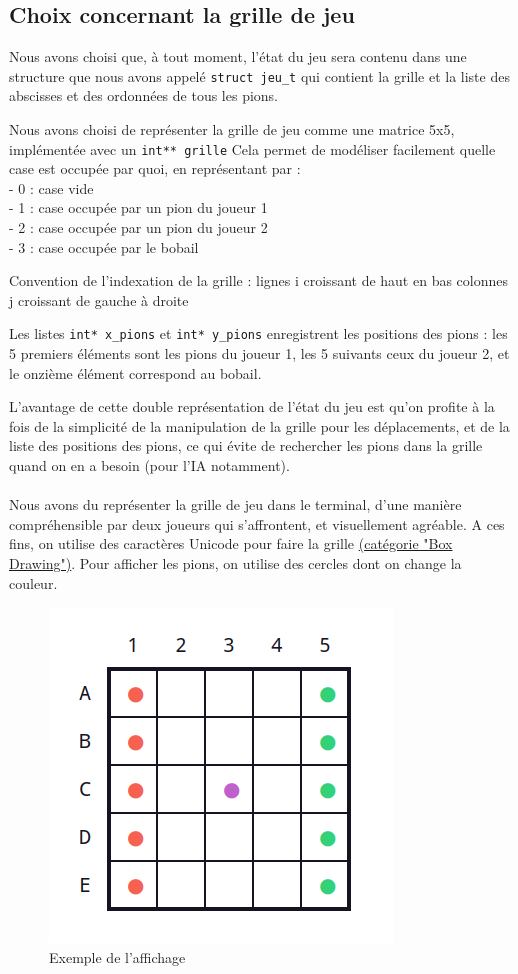 \documentclass{article}
\begin{document}
\subsection{Choix concernant la grille de jeu}

Nous avons choisi que, à tout moment, l'état du jeu sera contenu dans une structure que nous avons appelé {\tt struct jeu\_t} qui contient la grille et la liste des abscisses et des ordonnées de tous les pions.


Nous avons choisi de représenter la grille de jeu comme une matrice 5x5, implémentée avec un {\tt int** grille}
Cela permet de modéliser facilement quelle case est occupée par quoi, en représentant par :
\\- 0 : case vide
\\- 1 : case occupée par un pion du joueur 1
\\- 2 : case occupée par un pion du joueur 2
\\- 3 : case occupée par le bobail


Convention de l'indexation de la grille :
lignes i croissant de haut en bas
colonnes j croissant de gauche à droite


Les listes {\tt int* x\_pions} et {\tt int* y\_pions} enregistrent les positions des pions : les 5 premiers éléments sont les pions du joueur 1, les 5 suivants ceux du joueur 2, et le onzième élément correspond au bobail.


L'avantage de cette double représentation de l'état du jeu est qu'on profite à la fois de la simplicité de la manipulation de la grille pour les déplacements, et de la liste des positions des pions, ce qui évite de rechercher les pions dans la grille quand on en a besoin (pour l'IA notamment).
\\
\\
Nous avons du représenter la grille de jeu dans le terminal, d'une manière compréhensible par deux joueurs qui s'affrontent, et visuellement agréable. A ces fins, on utilise des caractères Unicode pour faire la grille  \href{https://en.wikipedia.org/wiki/List_of_Unicode_characters}{(catégorie "Box Drawing")}.
Pour afficher les pions, on utilise des cercles dont on change la couleur.

\begin{figure}[H]
    \centering
    \includegraphics[width=0.5\linewidth]{grille.png}
    \caption{Exemple de l'affichage}
    \label{fig:1}
\end{figure}
\end{document}
